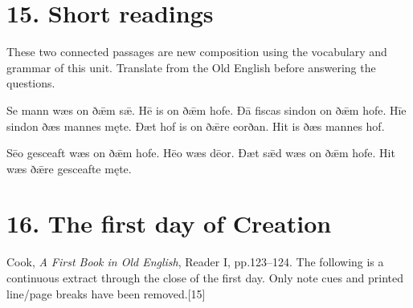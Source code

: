 

\section*{15. Short readings}

These two connected passages are new composition using the vocabulary and grammar of this unit. Translate from the Old English before answering the questions.


Se mann wæs on ðǣm sǣ. Hē is on ðǣm hofe. Ðā fiscas sindon on ðǣm hofe. Hīe sindon ðæs mannes męte. Ðæt hof is on ðǣre eorðan. Hit is ðæs mannes hof.


Sēo gesceaft wæs on ðǣm hofe. Hēo wæs dēor. Ðæt sǣd wæs on ðǣm hofe. Hit wæs ðǣre gesceafte męte.

\section*{16. The first day of Creation}

Cook, \emph{A First Book in Old English}, Reader I, pp.123–124. The following is a continuous extract through the close of the first day. Only note cues and printed line/\allowbreak{}page breaks have been removed.[15]

